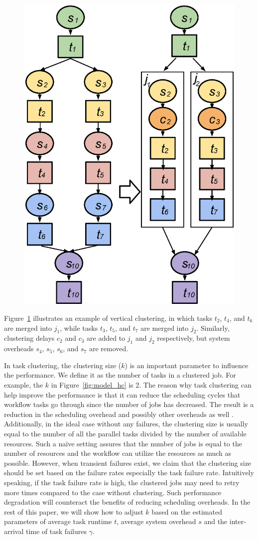 \documentclass{IOS-Book-Article}
\begin{document}
\begin{figure}[!htb]
\centering
 \includegraphics[width=0.6\linewidth]{figure4.eps}
  \label{fig:model_vc}
\end{figure}

Figure~\ref{fig:model_vc} illustrates an example of vertical clustering, in which tasks $t_2$, $t_4$, and $t_6$ are merged into $j_1$, while tasks $t_3$, $t_5$, and $t_7$ are merged into $j_2$. Similarly, clustering delays $c_2$ and $c_3$ are added to $j_1$ and $j_2$ respectively, but system overheads $s_4$, $s_5$, $s_6$, and $s_7$ are removed. 


In task clustering, the clustering size ($k$) is an important parameter to influence the performance. We define it as the number of tasks in a clustered job. For example, the $k$ in Figure~\ref{fig:model_hc} is 2. The reason why task clustering can help improve the performance is that it can reduce the scheduling cycles that workflow tasks go through since the number of jobs has decreased. The result is a reduction in the scheduling overhead and possibly other overheads as well \cite{Chen2011}. Additionally, in the ideal case without any failures, the clustering size is usually equal to the number of all the parallel tasks divided by the number of available resources. Such a naïve setting assures that the number of jobs is equal to the number of resources and the workflow can utilize the resources as much as possible. However, when transient failures exist, we claim that the clustering size should be set based on the failure rates especially the task failure rate. Intuitively speaking, if the task failure rate is high, the clustered jobs may need to retry more times compared to the case without clustering. Such performance degradation will counteract the benefits of reducing scheduling overheads. In the rest of this paper, we will show how to adjust $k$ based on the estimated parameters of average task runtime $t$, average system overhead $s$ and the inter-arrival time of task failures $\gamma$. 
\end{document}
